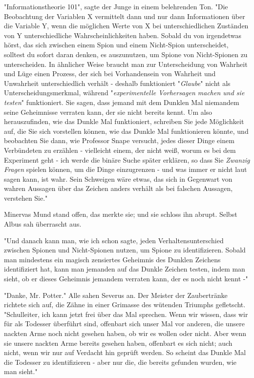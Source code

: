 {"Informationstheorie 101", sagte der Junge in einem belehrenden Ton. "Die Beobachtung der Variablen X vermittelt dann und nur dann Informationen über die Variable Y, wenn die möglichen Werte von X bei unterschiedlichen Zuständen von Y unterschiedliche Wahrscheinlichkeiten haben. Sobald du von irgendetwas hörst, das sich zwischen einem Spion und einem Nicht-Spion unterscheidet, solltest du sofort daran denken, es auszunutzen, um Spione von Nicht-Spionen zu unterscheiden. In ähnlicher Weise braucht man zur Unterscheidung von Wahrheit und Lüge einen Prozess, der sich bei Vorhandensein von Wahrheit und Unwahrheit unterschiedlich verhält - deshalb funktioniert "\emph{Glaube}" nicht als Unterscheidungsmerkmal, während "\emph{experimentelle Vorhersagen machen und sie testen}" funktioniert. Sie sagen, dass jemand mit dem Dunklen Mal niemandem seine Geheimnisse verraten kann, der sie nicht bereits kennt. Um also herauszufinden, wie das Dunkle Mal funktioniert, schreiben Sie jede Möglichkeit auf, die Sie sich vorstellen können, wie das Dunkle Mal funktionieren könnte, und beobachten Sie dann, wie Professor Snape versucht, jedes dieser Dinge einem Verbündeten zu erzählen - vielleicht einem, der nicht weiß, worum es bei dem Experiment geht - ich werde die binäre Suche später erklären, so dass Sie \emph{Zwanzig Fragen} spielen können, um die Dinge einzugrenzen - und was immer er nicht laut sagen kann, ist wahr. Sein Schweigen wäre etwas, das sich in Gegenwart von wahren Aussagen über das Zeichen anders verhält als bei falschen Aussagen, verstehen Sie."

Minervas Mund stand offen, das merkte sie; und sie schloss ihn abrupt. Selbst Albus sah überrascht aus.

"Und danach kann man, wie ich schon sagte, jeden Verhaltensunterschied zwischen Spionen und Nicht-Spionen nutzen, um Spione zu identifizieren. Sobald man mindestens ein magisch zensiertes Geheimnis des Dunklen Zeichens identifiziert hat, kann man jemanden auf das Dunkle Zeichen testen, indem man sieht, ob er dieses Geheimnis jemandem verraten kann, der es noch nicht kennt -"

"Danke, Mr. Potter." Alle sahen Severus an. Der Meister der Zaubertränke richtete sich auf, die Zähne in einer Grimasse des wütenden Triumphs gefletscht. "Schulleiter, ich kann jetzt frei über das Mal sprechen. Wenn wir wissen, dass wir für als Todesser überführt sind, offenbart sich unser Mal vor anderen, die unsere nackten Arme noch nicht gesehen haben, ob wir es wollen oder nicht. Aber wenn sie unsere nackten Arme bereits gesehen haben, offenbart es sich nicht; auch nicht, wenn wir nur auf Verdacht hin geprüft werden. So scheint das Dunkle Mal die Todesser zu identifizieren - aber nur die, die bereits gefunden wurden, wie man sieht."

}
